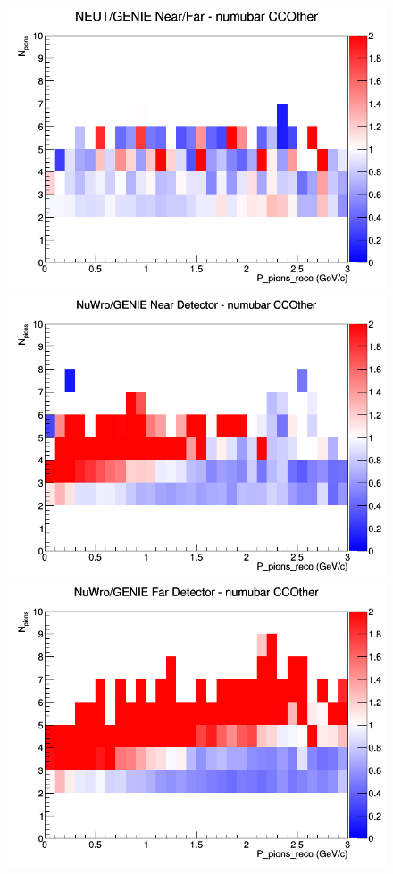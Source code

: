 \documentclass[12pt]{article}
\begin{document}
\begin{figure}[h]
\endminipage
{}
\includegraphics[width=\linewidth]{eff_N_P/LAr/pions/ratios/CCOther_NEUT_GENIE_numubar_NF_N_P.png}
\endminipage
\newline
{}
\includegraphics[width=\linewidth]{eff_N_P/LAr/pions/ratios/CCOther_NuWro_GENIE_numubar_near_N_P.png}
\endminipage
{}
\includegraphics[width=\linewidth]{eff_N_P/LAr/pions/ratios/CCOther_NuWro_GENIE_numubar_far_N_P.png}

\end{figure}
\end{document}
